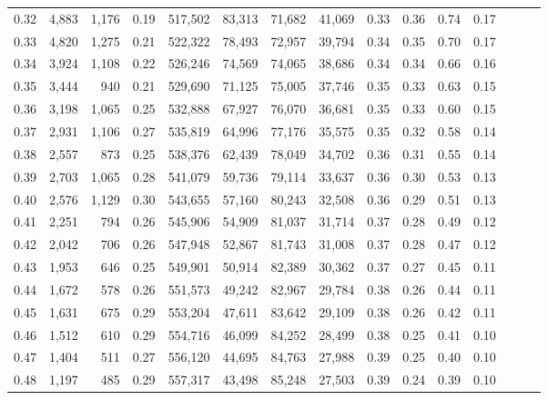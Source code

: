 \begin{tabular}{rrrrrrrrrrrrrrr}
0.32 &   4,883 &  1,176 &  0.19 &  517,502 &   83,313 &   71,682 &   41,069 &  0.33 &  0.36 &  0.74 &      0.17 \\
0.33 &   4,820 &  1,275 &  0.21 &  522,322 &   78,493 &   72,957 &   39,794 &  0.34 &  0.35 &  0.70 &      0.17 \\
0.34 &   3,924 &  1,108 &  0.22 &  526,246 &   74,569 &   74,065 &   38,686 &  0.34 &  0.34 &  0.66 &      0.16 \\
0.35 &   3,444 &    940 &  0.21 &  529,690 &   71,125 &   75,005 &   37,746 &  0.35 &  0.33 &  0.63 &      0.15 \\
0.36 &   3,198 &  1,065 &  0.25 &  532,888 &   67,927 &   76,070 &   36,681 &  0.35 &  0.33 &  0.60 &      0.15 \\
0.37 &   2,931 &  1,106 &  0.27 &  535,819 &   64,996 &   77,176 &   35,575 &  0.35 &  0.32 &  0.58 &      0.14 \\
0.38 &   2,557 &    873 &  0.25 &  538,376 &   62,439 &   78,049 &   34,702 &  0.36 &  0.31 &  0.55 &      0.14 \\
0.39 &   2,703 &  1,065 &  0.28 &  541,079 &   59,736 &   79,114 &   33,637 &  0.36 &  0.30 &  0.53 &      0.13 \\
0.40 &   2,576 &  1,129 &  0.30 &  543,655 &   57,160 &   80,243 &   32,508 &  0.36 &  0.29 &  0.51 &      0.13 \\
0.41 &   2,251 &    794 &  0.26 &  545,906 &   54,909 &   81,037 &   31,714 &  0.37 &  0.28 &  0.49 &      0.12 \\
0.42 &   2,042 &    706 &  0.26 &  547,948 &   52,867 &   81,743 &   31,008 &  0.37 &  0.28 &  0.47 &      0.12 \\
0.43 &   1,953 &    646 &  0.25 &  549,901 &   50,914 &   82,389 &   30,362 &  0.37 &  0.27 &  0.45 &      0.11 \\
0.44 &   1,672 &    578 &  0.26 &  551,573 &   49,242 &   82,967 &   29,784 &  0.38 &  0.26 &  0.44 &      0.11 \\
0.45 &   1,631 &    675 &  0.29 &  553,204 &   47,611 &   83,642 &   29,109 &  0.38 &  0.26 &  0.42 &      0.11 \\
0.46 &   1,512 &    610 &  0.29 &  554,716 &   46,099 &   84,252 &   28,499 &  0.38 &  0.25 &  0.41 &      0.10 \\
0.47 &   1,404 &    511 &  0.27 &  556,120 &   44,695 &   84,763 &   27,988 &  0.39 &  0.25 &  0.40 &      0.10 \\
0.48 &   1,197 &    485 &  0.29 &  557,317 &   43,498 &   85,248 &   27,503 &  0.39 &  0.24 &  0.39 &      0.10 \\

\end{tabular}
